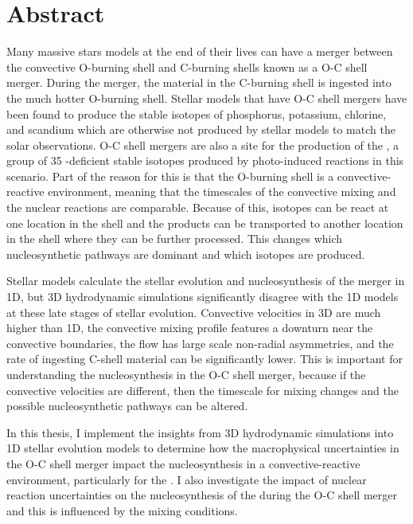 \newpage
{}

\section*{\large Abstract}

Many massive stars models at the end of their lives can have a merger between the convective O-burning shell and C-burning shells known as a O-C shell merger.
During the merger, the material in the C-burning shell is ingested into the much hotter O-burning shell.
Stellar models that have O-C shell mergers have been found to produce the stable isotopes of phosphorus, potassium, chlorine, and scandium which are otherwise not produced by stellar models to match the solar observations.
O-C shell mergers are also a site for the production of the \pnucn{}, a group of 35 \nt-deficient stable isotopes produced by photo-induced reactions in this scenario.
Part of the reason for this is that the O-burning shell is a convective-reactive environment, meaning that the timescales of the convective mixing and the nuclear reactions are comparable.
Because of this, isotopes can be react at one location in the shell and the products can be transported to another location in the shell where they can be further processed.
This changes which nucleosynthetic pathways are dominant and which isotopes are produced.

Stellar models calculate the stellar evolution and nucleosynthesis of the merger in 1D, but 3D hydrodynamic simulations significantly disagree with the 1D models at these late stages of stellar evolution.
Convective velocities in 3D are much higher than 1D, the convective mixing profile features a downturn near the convective boundaries, the flow has large scale non-radial asymmetries, and the rate of ingesting C-shell material can be significantly lower.
This is important for understanding the nucleosynthesis in the O-C shell merger, because if the convective velocities are different, then the timescale for mixing changes and the possible nucleosynthetic pathways can be altered.

In this thesis, I implement the insights from 3D hydrodynamic simulations into 1D stellar evolution models to determine how the macrophysical uncertainties in the O-C shell merger impact the nucleosynthesis in a convective-reactive environment, particularly for the \pnucn.
I also investigate the impact of nuclear reaction uncertainties on the nucleosynthesis of the \pnucn{} during the O-C shell merger and this is influenced by the mixing conditions.
